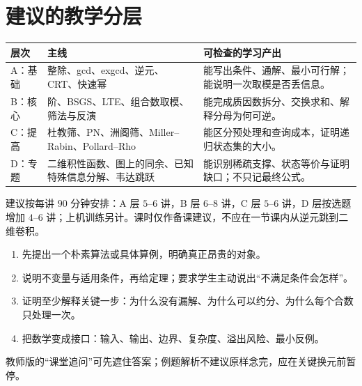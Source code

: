 \documentclass[UTF8,a4paper,11pt,oneside,openany,fontset=fandol]{ctexbook}
\theoremstyle{definition}
\begin{document}
\section*{建议的教学分层}
\begin{longtable}{p{}p{}p{}}
\toprule
层次 & 主线 & 可检查的学习产出\\\midrule
A：基础 & 整除、gcd、exgcd、逆元、CRT、快速幂 & 能写出条件、通解、最小可行解；能说明一次取模是否丢信息。\\
B：核心 & 阶、BSGS、LTE、组合数取模、筛法与反演 & 能完成质因数拆分、交换求和、解释分母为何可逆。\\
C：提高 & 杜教筛、PN、洲阁筛、Miller--Rabin、Pollard--Rho & 能区分预处理和查询成本，证明递归状态集的大小。\\
D：专题 & 二维积性函数、图上的同余、已知特殊信息分解、韦达跳跃 & 能识别稀疏支撑、状态等价与证明缺口；不只记最终公式。\\
\bottomrule
\end{longtable}

建议按每讲 $90$ 分钟安排：A 层 $5$--$6$ 讲，B 层 $6$--$8$ 讲，C 层 $5$--$6$ 讲，D 层按选题增加 $4$--$6$ 讲；上机训练另计。课时仅作备课建议，不应在一节课内从逆元跳到二维卷积。

\begin{teach}[每个定理的四步讲法]
\begin{enumerate}
\item 先提出一个朴素算法或具体算例，明确真正昂贵的对象。
\item 说明不变量与适用条件，再给定理；要求学生主动说出“不满足条件会怎样”。
\item 证明至少解释关键一步：为什么没有漏解、为什么可以约分、为什么每个合数只处理一次。
\item 把数学变成接口：输入、输出、边界、复杂度、溢出风险、最小反例。
\end{enumerate}
教师版的“课堂追问”可先遮住答案；例题解析不建议原样念完，应在关键换元前暂停。
\end{teach}

\end{document}
